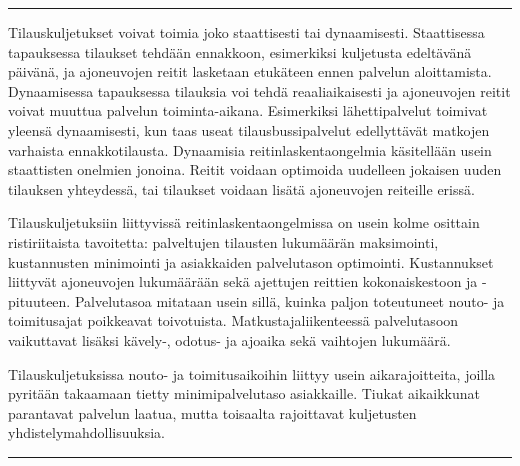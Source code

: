 \documentclass[a4paper,12pt]{article}
\newcommand*\sepline{%
  \begin{center}
    \rule[1ex]{.5\textwidth}{.5pt}
  \end{center}}
\begin{document}
\sepline

Tilauskuljetukset voivat toimia joko staattisesti tai dynaamisesti. Staattisessa tapauksessa tilaukset tehdään ennakkoon, 
esimerkiksi kuljetusta edeltävänä päivänä, ja ajoneuvojen reitit lasketaan etukäteen ennen palvelun aloittamista. 
Dynaamisessa tapauksessa tilauksia voi tehdä reaaliaikaisesti ja ajoneuvojen reitit voivat muuttua palvelun toiminta-aikana.
Esimerkiksi lähettipalvelut toimivat yleensä dynaamisesti, kun taas useat tilausbussipalvelut edellyttävät matkojen varhaista ennakkotilausta. %
Dynaamisia reitinlaskentaongelmia käsitellään usein staattisten onelmien jonoina. Reitit voidaan optimoida uudelleen jokaisen uuden 
tilauksen yhteydessä, tai tilaukset voidaan lisätä ajoneuvojen reiteille erissä. 

Tilauskuljetuksiin liittyvissä reitinlaskentaongelmissa on usein kolme osittain ristiriitaista tavoitetta:
palveltujen tilausten lukumäärän maksimointi, kustannusten minimointi ja asiakkaiden palvelutason optimointi.
Kustannukset liittyvät ajoneuvojen lukumäärään sekä ajettujen reittien kokonaiskestoon ja -pituuteen.
Palvelutasoa mitataan usein sillä, kuinka paljon toteutuneet nouto- ja toimitusajat poikkeavat toivotuista. 
Matkustajaliikenteessä palvelutasoon vaikuttavat lisäksi kävely-, odotus- ja ajoaika sekä vaihtojen lukumäärä.

Tilauskuljetuksissa nouto- ja toimitusaikoihin liittyy usein aikarajoitteita, %
joilla pyritään takaamaan tietty minimipalvelutaso asiakkaille. Tiukat aikaikkunat parantavat palvelun laatua,
mutta toisaalta rajoittavat kuljetusten yhdistelymahdollisuuksia.

\sepline


\end{document}
